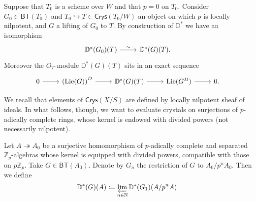 \begin{rem}[]\label{rem:DGValuationRestriction}
	Suppose that $T_0$ is a scheme over $W$ and that $p = 0$ on $T_0$.
	Consider $G_0 \in \mathsf{BT}(T_0)$ and $T_0 \hookrightarrow T \in \mathsf{Crys}(T_0/W)$
	an object on which $p$ is locally nilpotent, and $G$ a lifting of $G_0$ to $T$.
	By construction of $\mathbb{D}^*$ we have an isomorphism
	\begin{equation*}
	\begin{tikzcd}[row sep = 0ex
		,/tikz/column 1/.append style={anchor=base east}
		,/tikz/column 2/.append style={anchor=base west}]
		\mathbb{D}^*(G_0)(T) \arrow[r, "\sim", rightarrow] &
		\mathbb{D}^*(G)(T)
	.\end{tikzcd}
	\end{equation*} 
	Moreover the $O_{ T }$-module $\mathbb{D}^*(G)(T)$ sits in an exact sequence
	\begin{equation*}
	\begin{tikzcd}
		0 \arrow[r, "", rightarrow] &
		\left( \mathrm{Lie}(G) \right)^D \arrow[r, "", rightarrow] &
		\mathbb{D}^*(G)(T) \arrow[r, "", rightarrow] &
		\mathrm{Lie}(G^D) \arrow[r, "", rightarrow] &
		0
	.\end{tikzcd}
	\end{equation*}
\end{rem}


\noindent
We recall that elements of $\mathsf{Crys}(X/S)$ are defined by
locally nilpotent sheaf of ideals.
In what follows, though, we want to evaluate crystals on
surjections of $p$-adically complete rings, whose kernel is endowed with divided powers
(not necessarily nilpotent).
\begin{defn}[]\label{defn:NotNilpotentEvaluation}
	Let $A \twoheadrightarrow A_0$ be a surjective homomorphism
	of $p$-adically complete and separated $\mathbb{Z}_{p}$-algebras
	whose kernel is equipped with divided powers, compatible with those on $p \mathbb{Z}_{p}$.
	Take $G \in \mathsf{BT}(A_0)$.
	Denote by $G_n$ the restriction of $G$ to $A_0/p^nA_0$.
	Then we define
	\begin{equation*}
		\mathbb{D}^*(G)(A) \coloneqq
		\varprojlim_{n \in \mathbb{N}} \mathbb{D}^*(G_1)(A/p^nA)
	.\end{equation*}
\end{defn}


